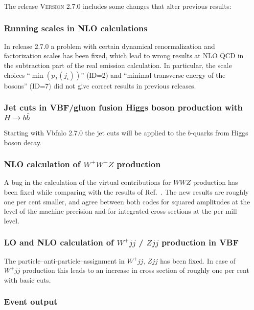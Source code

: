 \documentclass[english,12pt]{article}
\begin{document}
The release \textsc{Version 2.7.0} includes some changes that alter previous results:


\subsubsection{Running scales in NLO calculations}

In release 2.7.0 a problem with certain dynamical renormalization and factorization
scales has been fixed, which lead to wrong results at NLO QCD in the subtraction part of the
real emission calculation. In particular, the scale choices ``$\min(p_T(j_i))$'' (ID=2)
and ``minimal transverse energy of the bosons'' (ID=7) did not give correct results
in previous releases.

          
\subsubsection{Jet cuts in VBF/gluon fusion Higgs boson production with $H\to b\bar{b}$}

Starting with {\sc Vbfnlo 2.7.0} the jet cuts will be applied to the
$b$-quarks from Higgs boson decay.


\subsubsection{NLO calculation of $W^+W^-Z$ production}

A bug in the calculation of the virtual contributions for $WWZ$
production has been fixed while comparing with the results of
Ref.~\cite{Nhung:2013jta}.  The new results are roughly one per cent
smaller, and agree between both codes for squared amplitudes at the
level of the machine precision and for integrated cross sections at the
per mill level.


\subsubsection{LO and NLO calculation of $W^+jj$ / $Zjj$ production in VBF}

The particle--anti-particle--assignment in $W^+jj$, $Zjj$ has been fixed.
In case of $W^+jj$ production this leads to an increase in cross section of roughly one per cent with basic cuts.


\subsubsection{Event output}
\end{document}
